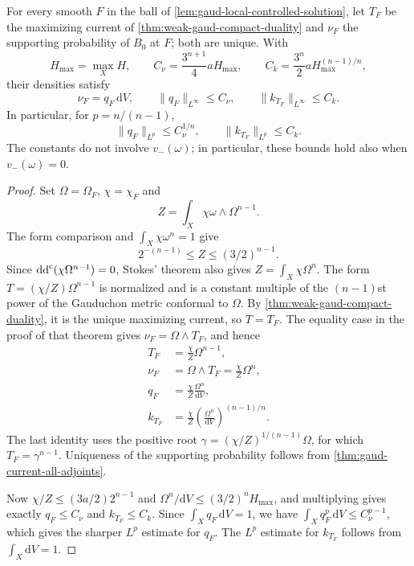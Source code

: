 \begin{theorem}\label{thm:gaud-local-adjoint-endpoint}
For every smooth $F$ in the ball of \cref{lem:gaud-local-controlled-solution}, let $T_F$ be the maximizing current of \cref{thm:weak-gaud-compact-duality} and $\nu_F$ the supporting probability of $B_0$ at $F$; both are unique. With
\[
 H_{\max}=\max_XH,\qquad
 C_\nu=\frac{3^{n+1}}4aH_{\max},\qquad
 C_k=\frac{3^n}2aH_{\max}^{(n-1)/n},
\]
their densities satisfy
\[
 \nu_F=q_F\,\mathrm{d}V,\qquad
 \|q_F\|_{L^\infty}\leq C_\nu,\qquad
 \|k_{T_F}\|_{L^\infty}\leq C_k.
\]
In particular, for $p=n/(n-1)$,
\[
 \|q_F\|_{L^p}\leq C_\nu^{1/n},\qquad
 \|k_{T_F}\|_{L^p}\leq C_k.
\]
The constants do not involve $v_-(\omega)$; in particular, these bounds hold also when $v_-(\omega)=0$.
\end{theorem}
\begin{proof}
Set $\Omega=\Omega_F$, $\chi=\chi_F$ and
\[
 Z=\int_X\chi\omega\wedge\Omega^{n-1}.
\]
The form comparison and $\int_X\chi\omega^n=1$ give
\begin{equation}\label{eq:gaud-local-factor-normalization}
 2^{-(n-1)}\leq Z\leq(3/2)^{n-1}.
\end{equation}
Since $\mathrm{dd}^{\mathrm{c}}(\chi\Omega^{n-1})=0$, Stokes' theorem also gives $Z=\int_X\chi\Omega^n$. The form $T=(\chi/Z)\Omega^{n-1}$ is normalized and is a constant multiple of the $(n-1)$st power of the Gauduchon metric conformal to $\Omega$. By \cref{thm:weak-gaud-compact-duality}, it is the unique maximizing current, so $T=T_F$. The equality case in the proof of that theorem gives $\nu_F=\Omega\wedge T_F$, and hence
\begin{equation}\label{eq:gaud-local-adjoint-densities}
 \begin{aligned}
 T_F&=\frac\chi Z\Omega^{n-1},\\
 \nu_F&=\Omega\wedge T_F=\frac\chi Z\Omega^n,\\
 q_F&=\frac\chi Z\frac{\Omega^n}{\mathrm{d}V},\\
 k_{T_F}&=\frac\chi Z
             \left(\frac{\Omega^n}{\mathrm{d}V}\right)^{(n-1)/n}.
 \end{aligned}
\end{equation}
The last identity uses the positive root $\gamma=(\chi/Z)^{1/(n-1)}\Omega$, for which $T_F=\gamma^{n-1}$. Uniqueness of the supporting probability follows from \cref{thm:gaud-current-all-adjoints}.

Now $\chi/Z\leq(3a/2)2^{n-1}$ and $\Omega^n/\mathrm{d}V\leq(3/2)^nH_{\max}$, and multiplying gives exactly $q_F\leq C_\nu$ and $k_{T_F}\leq C_k$. Since $\int_Xq_F\,\mathrm{d}V=1$, we have $\int_Xq_F^p\,\mathrm{d}V\leq C_\nu^{p-1}$, which gives the sharper $L^p$ estimate for $q_F$. The $L^p$ estimate for $k_{T_F}$ follows from $\int_X\mathrm{d}V=1$.
\end{proof}

